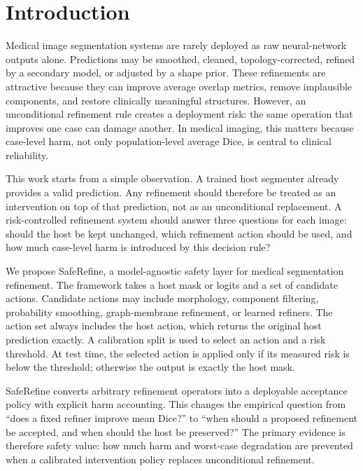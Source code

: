 \documentclass[preprint,12pt]{elsarticle}
\begin{document}
\section{Introduction}

Medical image segmentation systems are rarely deployed as raw neural-network
outputs alone. Predictions may be smoothed, cleaned, topology-corrected,
refined by a secondary model, or adjusted by a shape prior. These refinements
are attractive because they can improve average overlap metrics, remove
implausible components, and restore clinically meaningful structures. However,
an unconditional refinement rule creates a deployment risk: the same operation
that improves one case can damage another. In medical imaging, this matters
because case-level harm, not only population-level average Dice, is central to
clinical reliability.

This work starts from a simple observation. A trained host segmenter already
provides a valid prediction. Any refinement should therefore be treated as an
intervention on top of that prediction, not as an unconditional replacement. A
risk-controlled refinement system should answer three questions for each image:
should the host be kept unchanged, which refinement action should be used, and
how much case-level harm is introduced by this decision rule?

We propose SafeRefine, a model-agnostic safety layer for medical segmentation
refinement. The framework takes a host mask or logits and a set of candidate
actions. Candidate actions may include morphology, component filtering,
probability smoothing, graph-membrane refinement, or learned refiners.
The action set always includes the host action, which returns the original host
prediction exactly. A calibration split is used to select an action and a risk
threshold. At test time, the selected action is applied only if its measured
risk is below the threshold; otherwise the output is exactly the host mask.

SafeRefine converts arbitrary refinement operators into a deployable acceptance
policy with explicit harm accounting. This changes the empirical question from
``does a fixed refiner improve mean Dice?'' to ``when should a proposed
refinement be accepted, and when should the host be preserved?'' The primary
evidence is therefore safety value: how much harm and worst-case degradation are
prevented when a calibrated intervention policy replaces unconditional
refinement.
\end{document}
